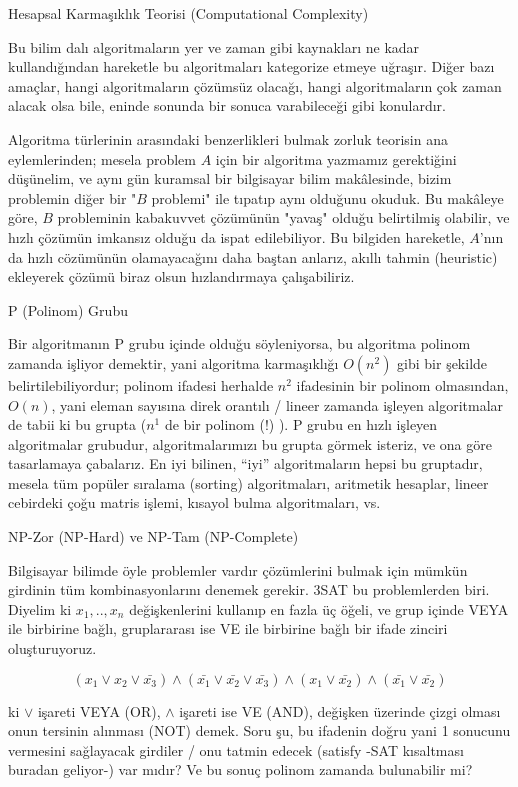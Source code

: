 \documentclass[12pt,fleqn]{article}\usepackage{../../common}
\begin{document}
Hesapsal Karmaşıklık Teorisi (Computational Complexity)

Bu bilim dalı algoritmaların yer ve zaman gibi kaynakları ne kadar
kullandığından hareketle bu algoritmaları kategorize etmeye uğraşır. Diğer
bazı amaçlar, hangi algoritmaların çözümsüz olacağı, hangi algoritmaların
çok zaman alacak olsa bile, eninde sonunda bir sonuca varabileceği gibi
konulardır.

Algoritma türlerinin arasındaki benzerlikleri bulmak zorluk teorisin ana
eylemlerinden; mesela problem $A$ için bir algoritma yazmamız gerektiğini
düşünelim, ve aynı gün kuramsal bir bilgisayar bilim makâlesinde, bizim
problemin diğer bir "$B$ problemi" ile tıpatıp aynı olduğunu okuduk. Bu makâleye
göre, $B$ probleminin kabakuvvet çözümünün "yavaş" olduğu belirtilmiş olabilir,
ve hızlı çözümün imkansız olduğu da ispat edilebiliyor. Bu bilgiden hareketle,
$A$'nın da hızlı cözümünün olamayacağını daha baştan anlarız, akıllı tahmin
(heuristic) ekleyerek çözümü biraz olsun hızlandırmaya çalışabiliriz.

P (Polinom) Grubu

Bir algoritmanın P grubu içinde olduğu söyleniyorsa, bu algoritma polinom
zamanda işliyor demektir, yani algoritma karmaşıklığı $O(n^2)$ gibi bir
şekilde belirtilebiliyordur; polinom ifadesi herhalde $n^2$ ifadesinin bir
polinom olmasından, $O(n)$, yani eleman sayısına direk orantılı / lineer
zamanda işleyen algoritmalar de tabii ki bu grupta ($n^1$ de bir polinom
(!) ). P grubu en hızlı işleyen algoritmalar grubudur, algoritmalarımızı bu
grupta görmek isteriz, ve ona göre tasarlamaya çabalarız. En iyi bilinen,
``iyi'' algoritmaların hepsi bu gruptadır, mesela tüm popüler sıralama
(sorting) algoritmaları, aritmetik hesaplar, lineer cebirdeki çoğu matris
işlemi, kısayol bulma algoritmaları, vs.

NP-Zor (NP-Hard) ve NP-Tam (NP-Complete)

Bilgisayar bilimde öyle problemler vardır çözümlerini bulmak için mümkün
girdinin tüm kombinasyonlarını denemek gerekir. 3SAT bu problemlerden
biri. Diyelim ki $x_1,..,x_n$ değişkenlerini kullanıp en fazla üç öğeli, ve
grup içinde VEYA ile birbirine bağlı, gruplararası ise VE ile birbirine
bağlı bir ifade zinciri oluşturuyoruz.

$$
(x_1 \lor x_2 \lor \bar{x_3}) \land 
(\bar{x_1} \lor \bar{x_2} \lor \bar{x_3}) \land
(x_1 \lor \bar{x_2}) \land
(\bar{x_1} \lor \bar{x_2})
$$

ki $\lor$ işareti VEYA (OR), $\land$ işareti ise VE (AND), değişken
üzerinde çizgi olması onun tersinin alınması (NOT) demek. Soru şu, bu
ifadenin doğru yani 1 sonucunu vermesini sağlayacak girdiler / onu tatmin
edecek (satisfy -SAT kısaltması buradan geliyor-) var mıdır? Ve bu sonuç
polinom zamanda bulunabilir mi?
\end{document}
